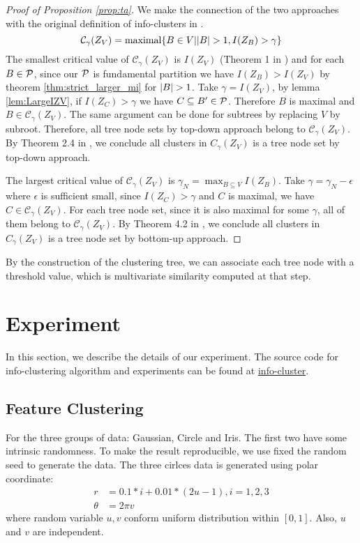 \documentclass{article}
\begin{document}
\begin{proof}[Proof of Proposition \ref{prop:ta}]
We make the connection of the two approaches with the original definition of info-clusters in \cite{RN1}.
\begin{equation}\label{eq:def_CgammaZV}
\mathcal{C}_{\gamma}(Z_V) = \textrm{maximal}\{ B \in V \vert \abs{B} > 1, I(Z_B) > \gamma \}
\end{equation}
The smallest critical value of $\mathcal{C}_{\gamma}(Z_V)$ is $I(Z_V)$ (Theorem 1 in \cite{RN1}) and for each $B \in \P$, since  our $\P$ is fundamental partition we have $I(Z_B) > I(Z_V)$ by theorem \ref{thm:strict_larger_mi} for $\abs{B}>1$. Take $\gamma = I(Z_V)$, by lemma \ref{lem:LargeIZV}, if $I(Z_C) > \gamma$ we have $C\subseteq B' \in \P$. Therefore $B$ is maximal and $B\in \mathcal{C}_{\gamma}(Z_V)$. The same argument can be done for subtrees by replacing $V$ by subroot. Therefore, all tree node sets by top-down approach belong to $\mathcal{C}_{\gamma}(Z_V)$. By Theorem 2.4 in \cite{RN1}, we conclude all clusters in $C_{\gamma}(Z_V)$ is a tree node set by top-down approach.

The largest critical value of $\mathcal{C}_{\gamma}(Z_V)$ is $\gamma_N = \max_{B\subseteq V} I(Z_B)$. Take $\gamma = \gamma_N - \epsilon$ where $\epsilon$ is sufficient small, since $I(Z_C) > \gamma$ and $C$ is maximal, we have $C \in \mathcal{C}_{\gamma}(Z_V)$. For each tree node set, since it is also maximal for some $\gamma$, all of them belong to $\mathcal{C}_{\gamma}(Z_V)$. By Theorem 4.2 in \cite{RN8}, we conclude all clusters in $C_{\gamma}(Z_V)$ is a tree node set by bottom-up approach.
\end{proof}
By the construction of the clustering tree, we can associate each tree node with a threshold value, which is multivariate similarity computed at that step.
\section{Experiment}
In this section, we describe the details of our experiment. The source code for info-clustering algorithm and experiments can be found at \href{https://github.com/zhaofeng-shu33/lab2c\_presentation\_template}{info-cluster}.
\subsection{Feature Clustering}
For the three groups of data: \textsf{Gaussian}, \textsf{Circle} and \textsf{Iris}. The first two have some intrinsic randomness. To make the result reproducible, we use fixed the random seed to generate the data. The three cirlces data is generated using polar coordinate:
\begin{align*}
r &= 0.1*i + 0.01*(2u-1), i = 1, 2, 3\\
\theta & = 2\pi v
\end{align*}
where random variable $u,v$ conform uniform distribution within $[0,1]$. Also, $u$ and $v$ are independent.
\end{document}
